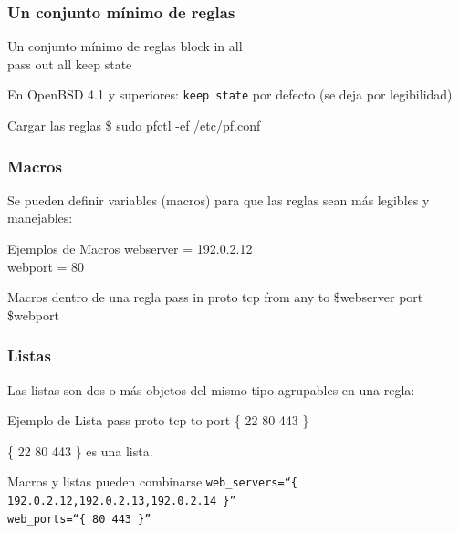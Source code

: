 \documentclass{beamer}
\begin{document}

\begin{frame}
\frametitle{Un conjunto mínimo de reglas}

\begin{block}{Un conjunto mínimo de reglas}
block in all \\
pass out all keep state
\end{block}

En OpenBSD 4.1 y superiores: \texttt{keep state} por defecto (se deja por legibilidad)

\begin{block}{Cargar las reglas}
\$ sudo pfctl -ef /etc/pf.conf
\end{block}


\end{frame}



\begin{frame}
\frametitle{Macros}

Se pueden definir variables (\alert{macros}) para que las reglas sean más legibles y 
manejables:

\begin{block}{Ejemplos de Macros}
webserver = 192.0.2.12 \\
webport = 80
\end{block}

\begin{block}{Macros dentro de una regla}
pass in proto tcp from any to \alert{\$webserver} port \alert{\$webport}
\end{block}

\end{frame}


\begin{frame}
\frametitle{Listas}

Las listas son dos o más objetos del mismo tipo agrupables en una regla:

\begin{block}{Ejemplo de Lista}
pass proto tcp to port \{ 22 80 443 \}
\end{block}

\{ 22 80 443 \} es una \alert{lista}.

\begin{block}{Macros y listas pueden combinarse}
\texttt{web\_servers=``\{ 192.0.2.12,192.0.2.13,192.0.2.14 \}''} \\
\texttt{web\_ports=``\{ 80 443 \}''}
\end{block}

\end{frame}
\end{document}
